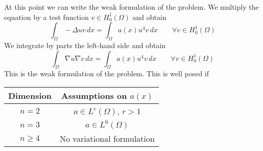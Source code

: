 At this point we can write the weak formulation of the problem. We multiply the
equation by a test function \(v \in H^1_0(\Omega)\) and obtain
\[
    \int_\Omega - \Delta u v \, dx = \int_\Omega a(x) u^4 v \, dx \qquad \forall v \in H^1_0(\Omega)
\]
We integrate by parts the left-hand side and obtain
\[
    \int_\Omega \nabla u \nabla v \, dx = \int_\Omega a(x) u^4 v \, dx \qquad \forall v \in H^1_0(\Omega)
\]
This is the weak formulation of the problem. This is well posed if
\begin{table}[h]
    \centering
    \begin{tabular}{|c|c|}
        \hline
        Dimension  & Assumptions on $a(x)$        \\
        \hline
        $n = 2$    & $a \in L^r(\Omega)$, $r > 1$ \\
        $n = 3$    & $a \in L^6(\Omega)$          \\
        $n \geq 4$ & No variational formulation   \\
        \hline
    \end{tabular}
\end{table}

